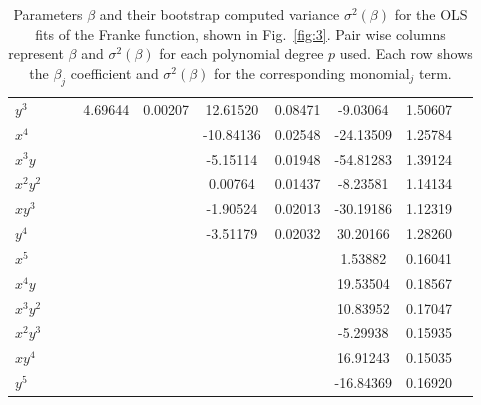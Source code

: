 \documentclass[a4paper]{article}
\newcommand{\fig}[1]{Fig.\ \ref{fig:#1}}
\begin{document}
\begin{multicols}{2}
\begin{table}
\begin{tabularx}{\textwidth}{X*{9}{S[table-format=4.3]}}
$y^3$     &          &         &  4.69644 & 0.00207 &  12.61520 & 0.08471 &  -9.03064 & 1.50607 \\[\myrowskip]
$x^4$     &          &         &          &         & -10.84136 & 0.02548 & -24.13509 & 1.25784 \\
$x^3y$    &          &         &          &         &  -5.15114 & 0.01948 & -54.81283 & 1.39124 \\
$x^2y^2$  &          &         &          &         &   0.00764 & 0.01437 &  -8.23581 & 1.14134 \\
$xy^3$    &          &         &          &         &  -1.90524 & 0.02013 & -30.19186 & 1.12319 \\
$y^4$     &          &         &          &         &  -3.51179 & 0.02032 &  30.20166 & 1.28260 \\[\myrowskip]
$x^5$     &          &         &          &         &           &         &   1.53882 & 0.16041 \\
$x^4y$    &          &         &          &         &           &         &  19.53504 & 0.18567 \\
$x^3y^2$  &          &         &          &         &           &         &  10.83952 & 0.17047 \\
$x^2y^3$  &          &         &          &         &           &         &  -5.29938 & 0.15935 \\
$xy^4$    &          &         &          &         &           &         &  16.91243 & 0.15035 \\
$y^5$     &          &         &          &         &           &         & -16.84369 & 0.16920 \\
\bottomrule 
\end{tabularx}
\caption{Parameters $\beta$ and their bootstrap computed variance $\sigma^2(\beta)$ for the OLS fits of the Franke function, shown in \fig{3}. Pair wise columns represent $\beta$ and $\sigma^2(\beta)$ for each polynomial degree $p$ used. Each row shows the $\beta_j$ coefficient and $\sigma^2(\beta)$ for the corresponding monomial${}_j$ term. \label{tab:1}}
\end{table}
\begin{figure}[p]
\vspace{-50pt}
\centering
{}

\end{figure}
\end{multicols}
\end{document}
